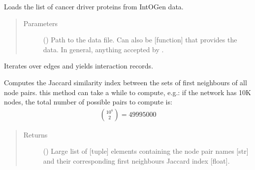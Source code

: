\documentclass[letterpaper,10pt,english]{sphinxmanual}
\begin{document}
\begin{fulllineitems}
\begin{fulllineitems}
\label{\detokenize{reference:pypath.main.PyPath.intogen_cancer_drivers_list}}
Loads the list of cancer driver proteins from IntOGen data.
\begin{quote}\begin{description}
\item[{Parameters}] \leavevmode
{} () \textendash{} Path to the data file. Can also be {[}function{]} that provides
the data. In general, anything accepted by
.

\end{description}\end{quote}

\end{fulllineitems}


\begin{fulllineitems}
\label{\detokenize{reference:pypath.main.PyPath.iter_interactions}}
Iterates over edges and yields interaction records.

\end{fulllineitems}


\begin{fulllineitems}
\label{\detokenize{reference:pypath.main.PyPath.jaccard_edges}}
Computes the Jaccard similarity index between the sets of first
neighbours of all node pairs.  this method can take a
while to compute, e.g.: if the network has 10K nodes, the total
number of possible pairs to compute is:
\begin{equation*}
\begin{split}\binom{10^4}{2} = 49995000\end{split}
\end{equation*}\begin{quote}\begin{description}
\item[{Returns}] \leavevmode
() \textendash{} Large list of {[}tuple{]} elements containing the
node pair names {[}str{]} and their corresponding first
neighbours Jaccard index {[}float{]}.


\end{description}
\end{quote}
\end{fulllineitems}
\end{fulllineitems}
\end{document}
